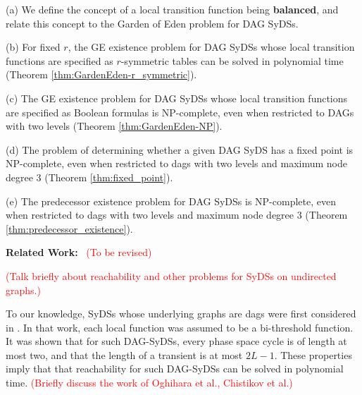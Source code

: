 \begin{description}
\item{(a)} We define the concept of a local transition function being {\bf balanced},
and relate this concept to the Garden of Eden problem for DAG SyDSs.

\item{(b)} For fixed $r$, the GE existence problem for DAG SyDSs
whose local transition functions are specified as $r$-symmetric tables
can be solved in polynomial time
(Theorem \ref{thm:GardenEden-r_symmetric}).

\item{(c)} The GE existence problem for DAG SyDSs
whose local transition functions are specified as Boolean formulas
is NP-complete,
even when restricted to DAGs with two levels
(Theorem \ref{thm:GardenEden-NP}).

\item{(d)} The problem of determining whether a given DAG SyDS 
has a fixed point is NP-complete,
even when restricted to dags with two levels and maximum node degree 3
(Theorem \ref{thm:fixed_point}).

\item{(e)} The predecessor existence problem for DAG SyDSs  is NP-complete,
even when restricted to dags with two levels and maximum node degree 3
(Theorem \ref{thm:predecessor_existence}).
\end{description}
\fi


\smallskip

\noindent
\textbf{Related Work:}~
\textcolor{red}{(To be revised)}

\textcolor{red}{(Talk briefly about reachability and other problems
for SyDSs on undirected graphs.)}

To our knowledge, SyDSs whose underlying graphs are dags
were first considered in \cite{KKM+2013}. 
In that work, each local function was assumed to be
a bi-threshold function.
It was shown that for such DAG-SyDSs,
every phase space cycle is of length at most two, 
and that the length of a transient is at most $2L-1$.
These properties imply that that reachability for such DAG-SyDSs
can be solved in polynomial time.
\textcolor{red}{(Briefly discuss the work of Oghihara et al., 
Chistikov et al.)}


